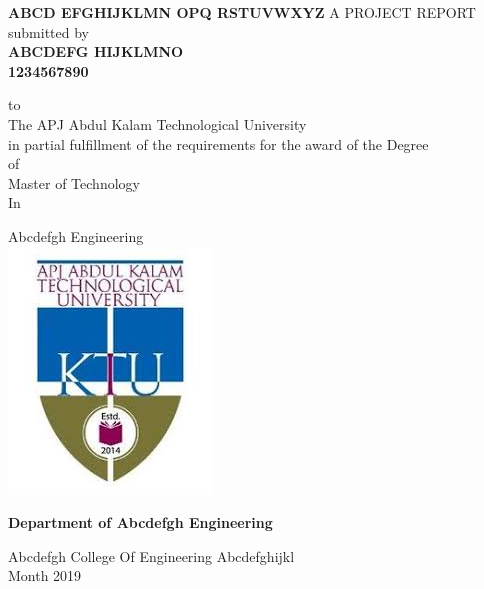 \documentclass[12pt,a4paper]{report}
\def \reptitle{Abcd Efghijklmn Opq Rstuvwxyz}
\def \repauthor{ABCDEFG HIJKLMNO}
\def \repregno{1234567890}
\def \repbranch{Abcdefgh Engineering}
\def \repcollege{Abcdefgh College Of Engineering}
\def \repplace{Abcdefghijkl}
\def \repuniversity{The APJ Abdul Kalam Technological University}
\def \repdate{Month 2019}
\begin{document}
\makeatletter
\renewcommand\chapter{\if@openright\cleardoublepage\else\clearpage\fi
                    \thispagestyle{empty}%
                    \global\@topnum\z@
                    \@afterindentfalse
                    \secdef\@chapter\@schapter}
\makeatother

\begin{titlepage}

\begin{center}
    \textbf{\MakeUppercase{ \Large \reptitle}}
    \vspace{.5 cm}
    \break
    A PROJECT REPORT \\submitted by\\
    \vspace{0.3 cm}
    \textbf{ \large \repauthor \\
    \repregno }
    \vspace{0.3 cm}

	to \\ \repuniversity \\ in partial fulfillment of the requirements 		for the award of the Degree \\ of \\ Master of Technology \\ In

	\repbranch \\
	
	\vspace{0.4 cm}
    \includegraphics[height=0.4\textwidth]{ktu_logo}\par
	\vspace{0.5 cm}
	\textbf{\Large Department of \repbranch}

	\repcollege
	\break
	\repplace \\
	\repdate 
    
    \vfill
\end{center}

\end{titlepage}
\end{document}
